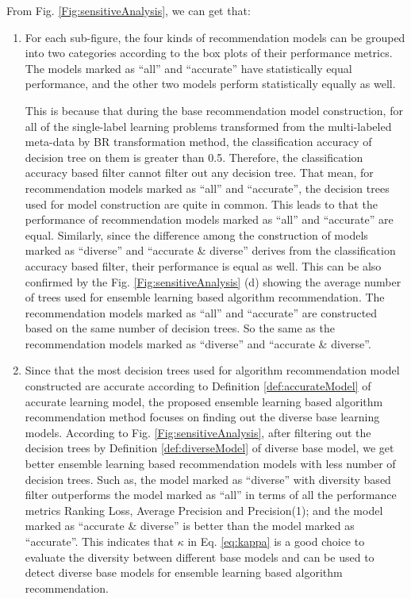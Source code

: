 \documentclass[acmsmall]{acmart}
\begin{document}
From Fig. \ref{Fig:sensitiveAnalysis}, we can get that:
\begin{enumerate}
	\item For each sub-figure, the four kinds of recommendation models can be grouped into
	two categories according to the box plots of their
	performance metrics. The models marked as ``all'' and ``accurate''
	have statistically equal performance, and the other two models perform
	statistically equally as well.
	
	\quad This is because that during the base recommendation model
	construction, for all of the single-label learning problems
	transformed from the multi-labeled meta-data by BR
	transformation method, the classification accuracy of decision tree on them is greater
	than 0.5. Therefore, the classification accuracy based filter
	cannot filter out any decision tree. That mean, for
	recommendation models marked as ``all'' and
	``accurate'', the decision trees used for model construction are
	quite in common. This leads to that the performance of recommendation
	models marked as ``all'' and ``accurate'' are equal.
	Similarly, since the difference among the construction of models
	marked as ``diverse'' and ``accurate \& diverse'' derives from the
	classification accuracy based filter, their performance is
	equal as well. This can be also confirmed by the Fig.
	\ref{Fig:sensitiveAnalysis} (d) showing the average number of
	trees used for ensemble learning based algorithm recommendation.
	The recommendation models marked as ``all'' and ``accurate'' are
	constructed based on the same number of decision trees.
	So the same as the recommendation models marked as ``diverse'' and ``accurate \&
	diverse''.
	
	\item Since that the most decision trees used for algorithm
	recommendation model constructed are accurate according to
	Definition \ref{def:accurateModel} of accurate learning model,
	the proposed ensemble learning based algorithm recommendation
	method focuses on finding out the diverse base learning
	models. According to Fig. \ref{Fig:sensitiveAnalysis}, after
	filtering out the decision trees by Definition
	\ref{def:diverseModel} of diverse base model, we get better
	ensemble learning based recommendation models with less
	number of decision trees. Such as, the model marked as ``diverse''
	with diversity based filter outperforms the model marked as
	``all'' in terms of all the performance metrics Ranking Loss,
	Average Precision and Precision(1); and the model marked as
	``accurate \& diverse'' is better than the model marked as
	``accurate''. This indicates that $\kappa$ in Eq. \ref{eq:kappa} is a good choice to
	evaluate the diversity between different base models and can
	be used to detect diverse base models for ensemble learning
	based algorithm recommendation.
\end{enumerate}
\end{document}
